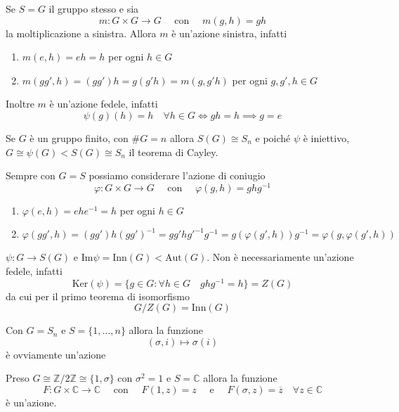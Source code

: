 \begin{example}
    Se \(S = G\) il gruppo stesso e sia
    \[
        m : G \times G \to G \quad \text{ con } \quad m{(g, h)} = gh
    \]
    la moltiplicazione a sinistra. Allora \(m\) è un'azione sinistra, infatti
\begin{enumerate}[label = \roman*)]
    \item \(m {(e, h)} = eh = h\) per ogni \(h \in G\) 
    \item \(m {(gg', h)} = {(g g')}h = g{(g'h)} = m {(g, g'h)}\) per ogni \(g,
        g', h \in G\) 
\end{enumerate}
    Inoltre \(m\) è un'azione fedele, infatti 
    \[
        \psi{(g)}{(h)} = h \quad\forall h \in G \iff gh = h \implies g = e
    \]
    \begin{remark}
        Se \(G\) è un gruppo finito, con \(\# G = n\) allora \(S{(G)} \cong S_n\)
        e poiché \(\psi\) è iniettivo, \(G \cong \psi{(G)} <  S{(G)} \cong S_n\)
        il teorema di Cayley.
    \end{remark}
\end{example}
\begin{example}
    Sempre con \(G = S\) possiamo considerare l'azione di coniugio
    \[
        \varphi : G \times G \to G \quad \text{ con } \quad \varphi{(g, h)} =
        ghg^{-1}
    \]
    \begin{enumerate}[label = \roman*)]
        \item \(\varphi{(e, h)} = ehe^{-1} = h\) per ogni \(h \in G\)
        \item \(\varphi {(g g', h)} = {(g g')}h {( g g' )}^{-1} = g g' h g'^{-1}
            g^{-1} = g{(\varphi {(g', h)})} g ^{-1} = \varphi {(g, \varphi {(g',
            h)})}\) 
    \end{enumerate}
    \(\psi : G \to S(G)\) e \(\text{Im} \psi = \text{Inn} {(G)} <
    \text{Aut}{(G)}\). Non è necessariamente un'azione fedele, infatti
    \[
        \text{Ker}{(\psi)} = \{g \in G : \forall h \in G \quad ghg^{-1} = h\} =
        Z(G)
    \]
    da cui per il primo teorema di isomorfismo
    \[
      G / Z{(G)} = \text{Inn}{(G)}
    \]
\end{example}
\begin{example}
    Con \(G = S_n\) e \(S = \{1, \dots, n\} \) allora la funzione
    \[
        (\sigma, i) \mapsto \sigma{(i)}
    \]
    è ovviamente un'azione
\end{example}
\begin{example}
    Preso \(G \cong \mathbb{Z} / 2 \mathbb{Z} \cong \{1, \sigma\} \) con
    \(\sigma^2 = 1\)  e \(S = \mathbb{C}\) allora la funzione
    \[
        F : G \times \mathbb{C} \to \mathbb{C} \quad \text{ con } \quad F{(1,
        z)} = z \quad \text{ e } \quad F{(\sigma, z)} = \overline{z} \quad
        \forall z \in \mathbb{C}
    \]
    è un'azione.
\end{example}
